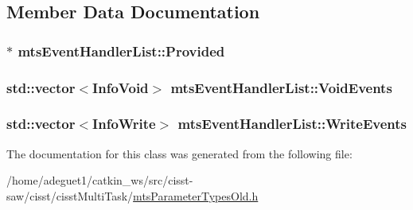 \subsection{Member Data Documentation}
\hypertarget{classmts_event_handler_list_a9e99be005cdcdb3ecfbb5bc2f3d79edb}{
\subsubsection[{Provided}]{$\ast$ mts\-Event\-Handler\-List\-::\-Provided}}\label{classmts_event_handler_list_a9e99be005cdcdb3ecfbb5bc2f3d79edb}
\hypertarget{classmts_event_handler_list_a8ef4db8408648d0cb17035158a483ad9}{
\subsubsection[{Void\-Events}]{\setlength{\rightskip}{0pt plus 5cm}std\-::vector$<${\bf Info\-Void}$>$ mts\-Event\-Handler\-List\-::\-Void\-Events}}\label{classmts_event_handler_list_a8ef4db8408648d0cb17035158a483ad9}
\hypertarget{classmts_event_handler_list_a81ec4eb1a15604dc9e2b0b88ff7c21a0}{
\subsubsection[{Write\-Events}]{\setlength{\rightskip}{0pt plus 5cm}std\-::vector$<${\bf Info\-Write}$>$ mts\-Event\-Handler\-List\-::\-Write\-Events}}\label{classmts_event_handler_list_a81ec4eb1a15604dc9e2b0b88ff7c21a0}


The documentation for this class was generated from the following file\-:\begin{DoxyCompactItemize}
\item 
/home/adeguet1/catkin\-\_\-ws/src/cisst-\/saw/cisst/cisst\-Multi\-Task/\hyperlink{mts_parameter_types_old_8h}{mts\-Parameter\-Types\-Old.\-h}\end{DoxyCompactItemize}
